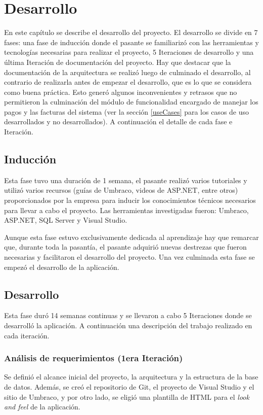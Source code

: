 \chapter{Desarrollo} \label{development}
En este capítulo se describe el desarrollo del proyecto. El desarrollo se divide en 7 fases: una fase de inducción donde el pasante se familiarizó con las herramientas y tecnologías necesarias para realizar el proyecto, 5 Iteraciones de desarrollo y una última Iteración de documentación del proyecto. Hay que destacar que la documentación de la arquitectura se realizó luego de culminado el desarrollo, al contrario de realizarla antes de empezar el desarrollo, que es lo que se considera como buena práctica. Esto generó algunos inconvenientes y retrasos que no permitieron la culminación del módulo de funcionalidad encargado de manejar los pagos y las facturas del sistema (ver la sección \ref{useCases} para los casos de uso desarrollados y no desarrollados). A continuación el detalle de cada fase e Iteración.

\section{Inducción}
Esta fase tuvo una duración de 1 semana, el pasante realizó varios tutoriales y utilizó varios recursos (guías de Umbraco, videos de ASP.NET, entre otros) proporcionados por la empresa para inducir los conocimientos técnicos necesarios para llevar a cabo el proyecto. Las herramientas investigadas fueron: Umbraco, ASP.NET, SQL Server y Visual Studio.

Aunque esta fase estuvo exclusivamente dedicada al aprendizaje hay que remarcar que, durante toda la pasantía, el pasante adquirió nuevas destrezas que fueron necesarias y facilitaron el desarrollo del proyecto. Una vez culminada esta fase se empezó el desarrollo de la aplicación.


\section{Desarrollo}
Esta fase duró 14 semanas continuas y se llevaron a cabo 5 Iteraciones donde se desarrolló la aplicación. A continuación una descripción del trabajo realizado en cada iteración.

\subsection{Análisis de requerimientos (1era Iteración)}
Se definió el alcance inicial del proyecto, la arquitectura y la estructura de la base de datos. Además, se creó el repositorio de Git, el proyecto de Visual Studio y el sitio de Umbraco, y por otro lado, se eligió una plantilla de HTML para el \emph{look and feel} de la aplicación.

